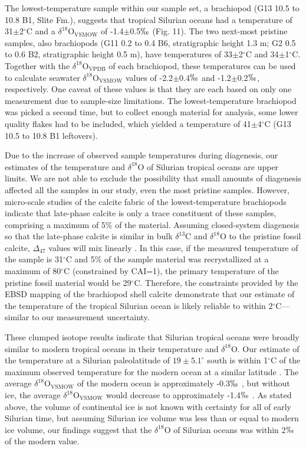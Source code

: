 \documentclass[preprint, authoryear]{elsarticle}
\begin{document}
The lowest-temperature sample within our sample set, a brachiopod (G13 10.5 to 10.8 B1, Slite Fm.), suggests that tropical Silurian oceans had a temperature of 31$\pm$2$^{\circ}$C and a $\delta^{18}$O$_{\text{VSMOW}}$ of -1.4$\pm$0.5$\permil$ (Fig. 11). The two next-most pristine samples, also brachiopods (G11 0.2 to 0.4 B6, stratigraphic height 1.3 m; G2 0.5 to 0.6 B2, stratigraphic height 0.5 m), have temperatures of 33$\pm$2$^{\circ}$C and 34$\pm$1$^{\circ}$C. Together with the $\delta^{18}$O$_{\text{VPDB}}$ of each brachiopod, these temperatures can be used to calculate seawater $\delta^{18}$O$_{\text{VSMOW}}$ values of -2.2$\pm$0.4$\permil$ and -1.2$\pm$0.2$\permil$, respectively. One caveat of these values is that they are each based on only one measurement due to sample-size limitations. The lowest-temperature brachiopod was picked a second time, but to collect enough material for analysis, some lower quality flakes had to be included, which yielded a temperature of 41$\pm$4$^{\circ}$C (G13 10.5 to 10.8 B1 leftovers). 

Due to the increase of observed sample temperatures during diagenesis, our estimates of the temperature and $\delta^{18}$O of Silurian tropical oceans are upper limits. We are not able to exclude the possibility that small amounts of diagenesis affected all the samples in our study, even the most pristine samples. However, micro-scale studies of the calcite fabric of the lowest-temperature brachiopods indicate that late-phase calcite is only a trace constituent of these samples, comprising a maximum of 5\% of the material. Assuming closed-system diagenesis so that the late-phase calcite is similar in bulk $\delta^{13}$C and $\delta^{18}$O to the pristine fossil calcite, $\Delta_{47}$ values will mix linearly \citep{Affek2006}. In this case, if the measured temperature of the sample is 31$^{\circ}$C and 5\% of the sample material was recrystallized at a maximum of 80$^{\circ}$C (constrained by CAI=1), the primary temperature of the pristine fossil material would be 29$^{\circ}$C. Therefore, the constraints provided by the EBSD mapping of the brachiopod shell calcite demonstrate that our estimate of the temperature of the tropical Silurian ocean is likely reliable to within 2$^{\circ}$C---similar to our measurement uncertainty.

These clumped isotope results indicate that Silurian tropical oceans were broadly similar to modern tropical oceans in their temperature and $\delta^{18}$O. Our estimate of the temperature at a Silurian paleolatitude of $19\pm5.1^{\circ}$ south \citep{Torsvik1992} is within 1$^{\circ}$C of the maximum observed temperature for the modern ocean at a similar latitude \citep{Reynolds1994}. The average $\delta^{18}$O$_{\text{VSMOW}}$ of the modern ocean is approximately -0.3$\permil$ \citep{Shackleton1974}, but without ice, the average $\delta^{18}$O$_{\text{VSMOW}}$ would decrease to approximately -1.4$\permil$ \citep{Lhomme2005}. As stated above, the volume of continental ice is not known with certainty for all of early Silurian time, but assuming Silurian ice volume was less than or equal to modern ice volume, our findings suggest that the $\delta^{18}$O of Silurian oceans was within 2$\permil$ of the modern value. 
\end{document}

